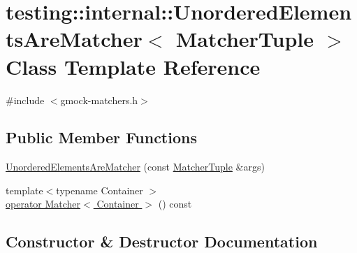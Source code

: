 \hypertarget{classtesting_1_1internal_1_1_unordered_elements_are_matcher}{}\section{testing\+:\+:internal\+:\+:Unordered\+Elements\+Are\+Matcher$<$ Matcher\+Tuple $>$ Class Template Reference}
\label{classtesting_1_1internal_1_1_unordered_elements_are_matcher}


{\ttfamily \#include $<$gmock-\/matchers.\+h$>$}

\subsection*{Public Member Functions}
\begin{DoxyCompactItemize}
\item 
\hyperlink{classtesting_1_1internal_1_1_unordered_elements_are_matcher_ae0a46833600dc8ef768d154ab111f5fa}{Unordered\+Elements\+Are\+Matcher} (const \hyperlink{structtesting_1_1internal_1_1_matcher_tuple}{Matcher\+Tuple} \&args)
\item 
{\footnotesize template$<$typename Container $>$ }\\\hyperlink{classtesting_1_1internal_1_1_unordered_elements_are_matcher_a5191cb321191985e257225b9a5df95f5}{operator Matcher$<$ Container $>$} () const
\end{DoxyCompactItemize}


\subsection{Constructor \& Destructor Documentation}
\mbox{\label{classtesting_1_1internal_1_1_unordered_elements_are_matcher_ae0a46833600dc8ef768d154ab111f5fa}} 
